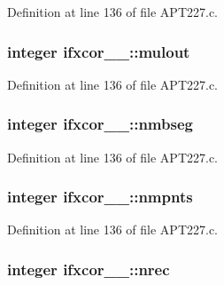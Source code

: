 Definition at line 136 of file A\+P\+T227.\+c.

\subsubsection[{\texorpdfstring{mulout}{mulout}}]{\setlength{\rightskip}{0pt plus 5cm}integer ifxcor\+\_\+\_\+\+::mulout}\hypertarget{structifxcor__1___a9bc3fe55ab23bdb38c73d028efd391ee}{}\label{structifxcor__1___a9bc3fe55ab23bdb38c73d028efd391ee}


Definition at line 136 of file A\+P\+T227.\+c.

\subsubsection[{\texorpdfstring{nmbseg}{nmbseg}}]{\setlength{\rightskip}{0pt plus 5cm}integer ifxcor\+\_\+\_\+\+::nmbseg}\hypertarget{structifxcor__1___a060bdb46de305b7daa001ca80ea91718}{}\label{structifxcor__1___a060bdb46de305b7daa001ca80ea91718}


Definition at line 136 of file A\+P\+T227.\+c.

\subsubsection[{\texorpdfstring{nmpnts}{nmpnts}}]{\setlength{\rightskip}{0pt plus 5cm}integer ifxcor\+\_\+\_\+\+::nmpnts}\hypertarget{structifxcor__1___ae8fe8cf0dd32714ac4ef0f3dcfc4c788}{}\label{structifxcor__1___ae8fe8cf0dd32714ac4ef0f3dcfc4c788}


Definition at line 136 of file A\+P\+T227.\+c.

\subsubsection[{\texorpdfstring{nrec}{nrec}}]{\setlength{\rightskip}{0pt plus 5cm}integer ifxcor\+\_\+\_\+\+::nrec}\hypertarget{structifxcor__1___a25515b9550bab52755e7bb476b9663bb}{}\label{structifxcor__1___a25515b9550bab52755e7bb476b9663bb}


